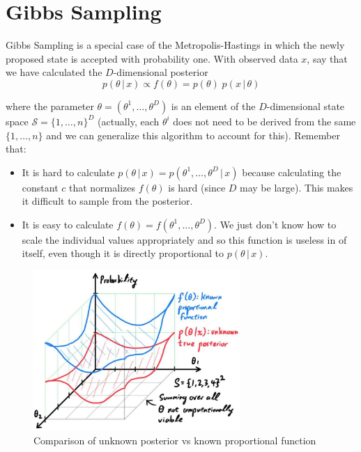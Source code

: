 \section{Gibbs Sampling}

  Gibbs Sampling is a special case of the Metropolis-Hastings in which the newly proposed state is accepted with probability one. With observed data $x$, say that we have calculated the $D$-dimensional posterior
  \begin{equation}
    p(\theta\,|\,x) \propto f(\theta) = p(\theta) \; p(x\,|\, \theta)
  \end{equation}

  where the parameter $\theta = (\theta^1, \ldots, \theta^D)$ is an element of the $D$-dimensional state space $\mathcal{S} = \{1, \ldots, n\}^D$ (actually, each $\theta^i$ does not need to be derived from the same $\{1, \ldots, n\}$ and we can generalize this algorithm to account for this). Remember that:
  \begin{itemize}
    \item It is hard to calculate $p(\theta\,|\,x) = p(\theta^1, \ldots, \theta^D\,|\,x)$ because calculating the constant $c$ that normalizes $f(\theta)$ is hard (since $D$ may be large). This makes it difficult to sample from the posterior.
    \item It is easy to calculate $f(\theta) = f(\theta^1, \ldots, \theta^D)$. We just don't know how to scale the individual values appropriately and so this function is useless in of itself, even though it is directly proportional to $p(\theta\,|\,x)$.
  \end{itemize}

  \begin{figure}[H]
    \centering
    \includegraphics[width=0.7\textwidth]{img/unknown_posterior_vs_known_f.jpg}
    \caption{Comparison of unknown posterior vs known proportional function}
  \end{figure}

